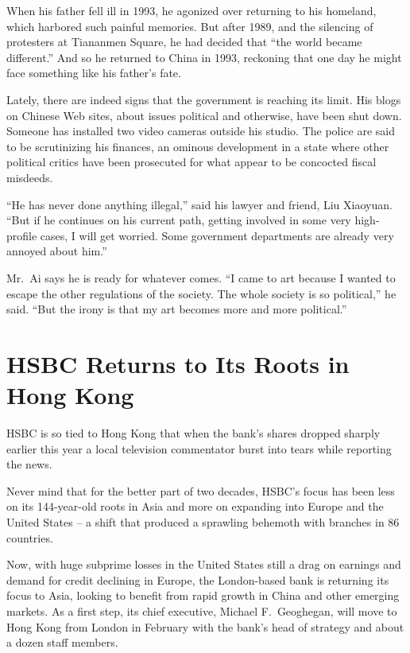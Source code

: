 ﻿\documentclass[12pt]{article}
\begin{document}
When his father fell ill in 1993, he agonized over returning to his homeland, which harbored such
painful memories. But after 1989, and the silencing of protesters at Tiananmen Square, he had
decided that ``the world became different.'' And so he returned to China in 1993, reckoning that one
day he might face something like his father's fate.

Lately, there are indeed signs that the government is reaching its limit. His blogs on Chinese Web
sites, about issues political and otherwise, have been shut down. Someone has installed two video
cameras outside his studio. The police are said to be scrutinizing his finances, an ominous
development in a state where other political critics have been prosecuted for what appear to be
concocted fiscal misdeeds.

``He has never done anything illegal,'' said his lawyer and friend, Liu Xiaoyuan. ``But if he
continues on his current path, getting involved in some very high-profile cases, I will get worried.
Some government departments are already very annoyed about him.''

Mr.~Ai says he is ready for whatever comes. ``I came to art because I wanted to escape the other
regulations of the society. The whole society is so political,'' he said. ``But the irony is that my
art becomes more and more political.''

\section{HSBC Returns to Its Roots in Hong Kong}

\lettrine{H}{SBC} is so tied to Hong Kong that when the bank's shares
dropped sharply earlier this year a local television commentator burst into tears while reporting
the news.

Never mind that for the better part of two decades, HSBC's focus has been less on its 144-year-old
roots in Asia and more on expanding into Europe and the United States -- a shift that produced a
sprawling behemoth\cite{behemoth} with branches in 86 countries.

Now, with huge subprime losses in the United States still a drag on earnings and demand for credit
declining in Europe, the London-based bank is returning its focus to Asia, looking to benefit from
rapid growth in China and other emerging markets. As a first step, its chief executive, Michael
F.~Geoghegan, will move to Hong Kong from London in February with the bank's head of strategy and
about a dozen staff members.
\end{document}
